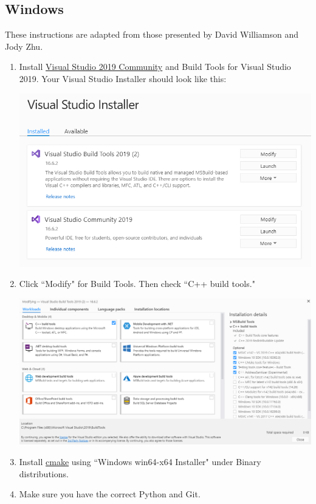\documentclass[11 pt]{article}
\begin{document}
\subsection{Windows}
These instructions are adapted from those presented by David Williamson and Jody Zhu.
\begin{enumerate}
\item Install \href{https://visualstudio.microsoft.com/downloads/}{Visual Studio 2019 Community} and Build Tools for Visual Studio 2019. Your Visual Studio Installer should look like this:
\begin{center}
\includegraphics[scale=0.4]{VS.png}
\end{center}
\item Click ``Modify" for Build Tools. Then check ``C++ build tools."
\begin{center}
\includegraphics[scale=0.3]{Modify.png}
\end{center}
\item Install \href{https://www.cmake.org/download}{cmake} using ``Windows win64-x64 Installer" under Binary distributions.
\item Make sure you have the correct Python and Git.

\end{enumerate}
\end{document}
